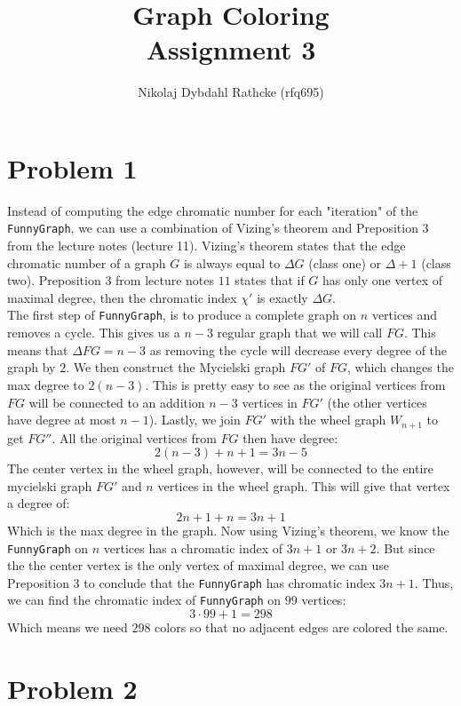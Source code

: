 \documentclass[a4paper]{article}
\author{Nikolaj Dybdahl Rathcke (rfq695)}
\title{Graph Coloring \\ Assignment 3}
\begin{document}
\maketitle

\section{Problem 1}
Instead of computing the edge chromatic number for each "iteration" of the \texttt{FunnyGraph}, we can use a combination of Vizing's theorem and Preposition $3$ from the lecture notes (lecture 11). Vizing's theorem states that the edge chromatic number of a graph $G$ is always equal to $\Delta G$ (class one) or $\Delta+1$ (class two). Preposition $3$ from lecture notes $11$ states that if $G$ has only one vertex of maximal degree, then the chromatic index $\chi'$ is exactly $\Delta G$. \\
The first step of \texttt{FunnyGraph}, is to produce a complete graph on $n$ vertices and removes a cycle. This gives us a $n-3$ regular graph that we will call $FG$. This means that $\Delta FG=n-3$ as removing the cycle will decrease every degree of the graph by $2$. We then construct the Mycielski graph $FG'$ of $FG$, which changes the max degree to $2(n-3)$. This is pretty easy to see as the original vertices from $FG$ will be connected to an addition $n-3$ vertices in $FG'$ (the other vertices have degree at most $n-1$). Lastly, we join $FG'$ with the wheel graph $W_{n+1}$ to get $FG''$. All the original vertices from $FG$ then have degree:
$$
2(n-3)+n+1=3n-5
$$
The center vertex in the wheel graph, however, will be connected to the entire mycielski graph $FG'$ and $n$ vertices in the wheel graph. This will give that vertex a degree of:
$$
2n+1+n=3n+1
$$
Which is the max degree in the graph. Now using Vizing's theorem, we know the \texttt{FunnyGraph} on $n$ vertices has a chromatic index of $3n+1$ or $3n+2$. But since the the center vertex is the only vertex of maximal degree, we can use Preposition $3$ to conclude that the \texttt{FunnyGraph} has chromatic index $3n+1$. Thus, we can find the chromatic index of \texttt{FunnyGraph} on $99$ vertices:
$$
3\cdot 99+1=298
$$
Which means we need $298$ colors so that no adjacent edges are colored the same.

\section{Problem 2}
\end{document}
